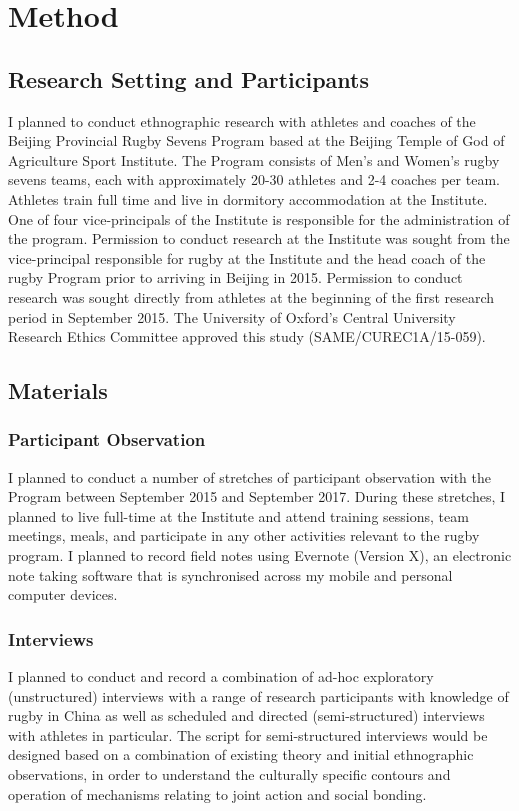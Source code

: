   \section{Method}




  \subsection{Research Setting and Participants}

  I planned to conduct ethnographic research with athletes and coaches of the Beijing Provincial Rugby Sevens Program based at the Beijing Temple of God of Agriculture Sport Institute.  The Program consists of Men's and Women's rugby sevens teams, each with approximately 20-30 athletes and 2-4 coaches per team. Athletes train full time and live in dormitory accommodation at the Institute.  One of four vice-principals of the Institute is responsible for the administration of the program.  Permission to conduct research at the Institute was sought from the vice-principal responsible for rugby at the Institute and the head coach of the rugby Program prior to arriving in Beijing in 2015.  Permission to conduct research was sought directly from athletes at the beginning of the first research period in September 2015. The University of Oxford’s Central University Research Ethics Committee approved this study (SAME/CUREC1A/15-059).

  \subsection{Materials}

    \subsubsection{Participant Observation}
    I planned to conduct a number of stretches of participant observation with the Program between September 2015 and September 2017.  During these stretches, I planned to live full-time at the Institute and attend training sessions, team meetings, meals, and participate in any other activities relevant to the rugby program.  I planned to record field notes using Evernote (Version X), an electronic note taking software that is synchronised across my mobile and personal computer devices.

    \subsubsection{Interviews}
    I planned to conduct and record a combination of ad-hoc exploratory (unstructured) interviews with a range of research participants with knowledge of rugby in China as well as scheduled and directed (semi-structured) interviews with athletes in particular.  The script for semi-structured interviews would be designed based on a combination of existing theory and initial ethnographic observations, in order to understand the culturally specific contours and operation of mechanisms relating to joint action and social bonding.

